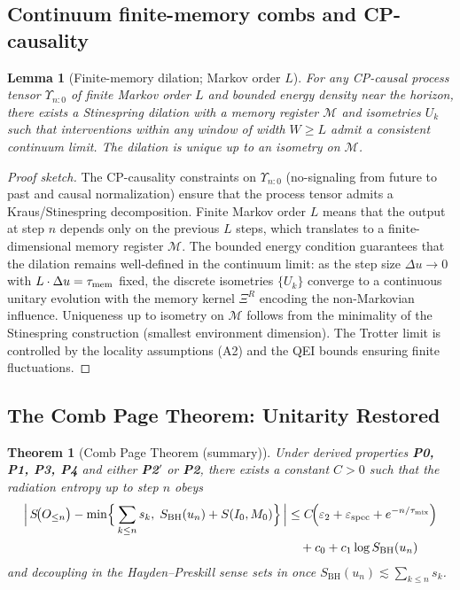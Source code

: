 \documentclass[a4paper,11pt]{article}
\theoremstyle{plain}
\newtheorem{theorem}{Theorem}
\newtheorem{lemma}{Lemma}
\theoremstyle{definition}
\theoremstyle{remark}
\begin{document}
\subsection*{Continuum finite-memory combs and CP-causality}
\begin{lemma}[Finite-memory dilation; Markov order $L$]\label{lem:finite-memory-dilation}
For any CP-causal process tensor $\Upsilon_{n:0}$ of finite Markov order $L$ and bounded energy density
near the horizon, there exists a Stinespring dilation with a memory register $\mathcal{M}$ and isometries $U_k$
such that interventions within any window of width $W\!\ge\!L$ admit a consistent continuum limit. The dilation
is unique up to an isometry on $\mathcal{M}$.
\end{lemma}
\begin{proof}[Proof sketch]
The CP-causality constraints on $\Upsilon_{n:0}$ (no-signaling from future to past and causal normalization) ensure that the process tensor admits a Kraus/Stinespring decomposition. Finite Markov order $L$ means that the output at step $n$ depends only on the previous $L$ steps, which translates to a finite-dimensional memory register $\mathcal{M}$. The bounded energy condition guarantees that the dilation remains well-defined in the continuum limit: as the step size $\Delta u\to 0$ with $L\cdot\Delta u=\tau_{\rm mem}$ fixed, the discrete isometries $\{U_k\}$ converge to a continuous unitary evolution with the memory kernel $\Xi^R$ encoding the non-Markovian influence. Uniqueness up to isometry on $\mathcal{M}$ follows from the minimality of the Stinespring construction (smallest environment dimension). The Trotter limit is controlled by the locality assumptions (A2) and the QEI bounds ensuring finite fluctuations.
\end{proof}

\subsection{The Comb Page Theorem: Unitarity Restored}
\label{sec:page_theorem}


\begin{theorem}[Comb Page Theorem (summary)]
\label{thm:comb-page-summary}
Under derived properties \textbf{P0, P1, P3, P4} and either \textbf{P2$'$} or \textbf{P2}, there exists a constant \(C>0\) such that the radiation entropy up to step \(n\) obeys
\begin{equation}
\label{eq:comb_min_principle}
\begin{aligned}
\Big|\,S\!\big(O_{\le n}\big)
- \min\!\Big\{\sum_{k\le n} s_k,\; S_{\mathrm{BH}}(u_n)+S(I_0,M_0)\Big\}\,\Big|
&\le C\!\Big(\varepsilon_2+\varepsilon_{\rm spec}+e^{-n/\tau_{\rm mix}}\Big) \\
&\quad + c_0 + c_1\log S_{\mathrm{BH}}(u_n)
\end{aligned}
\end{equation}
and decoupling in the Hayden--Preskill sense sets in once
\(S_{\mathrm{BH}}(u_n) \lesssim \sum_{k\le n} s_k\).
\end{theorem}
\end{document}
